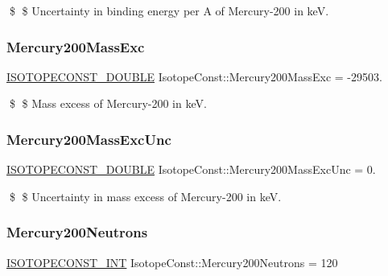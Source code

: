 \$ \$ Uncertainty in binding energy per A of Mercury-\/200 in keV. \mbox{\label{group___isotope_const-_mercury-_hg200_ga83af034bbdd29a352376cb4221ca7f71}} 
\subsubsection{\texorpdfstring{Mercury200\+Mass\+Exc}{Mercury200MassExc}}
{\footnotesize\ttfamily \mbox{\hyperlink{group___isotope_const-_macros_ga8f45a7272ce02c0b4c65c44636ed719a}{I\+S\+O\+T\+O\+P\+E\+C\+O\+N\+S\+T\+\_\+\+D\+O\+U\+B\+LE}} Isotope\+Const\+::\+Mercury200\+Mass\+Exc = -\/29503.}

\$ \$ Mass excess of Mercury-\/200 in keV. \mbox{\label{group___isotope_const-_mercury-_hg200_ga955c02b253bccfffd7bbc0d7860822bc}} 
\subsubsection{\texorpdfstring{Mercury200\+Mass\+Exc\+Unc}{Mercury200MassExcUnc}}
{\footnotesize\ttfamily \mbox{\hyperlink{group___isotope_const-_macros_ga8f45a7272ce02c0b4c65c44636ed719a}{I\+S\+O\+T\+O\+P\+E\+C\+O\+N\+S\+T\+\_\+\+D\+O\+U\+B\+LE}} Isotope\+Const\+::\+Mercury200\+Mass\+Exc\+Unc = 0.}

\$ \$ Uncertainty in mass excess of Mercury-\/200 in keV. \mbox{\label{group___isotope_const-_mercury-_hg200_gac0315dd8896d67933f2467b72f146458}} 
\subsubsection{\texorpdfstring{Mercury200\+Neutrons}{Mercury200Neutrons}}
{\footnotesize\ttfamily \mbox{\hyperlink{group___isotope_const-_macros_ga5f18360b3e99483a35c32d789e62621c}{I\+S\+O\+T\+O\+P\+E\+C\+O\+N\+S\+T\+\_\+\+I\+NT}} Isotope\+Const\+::\+Mercury200\+Neutrons = 120}

